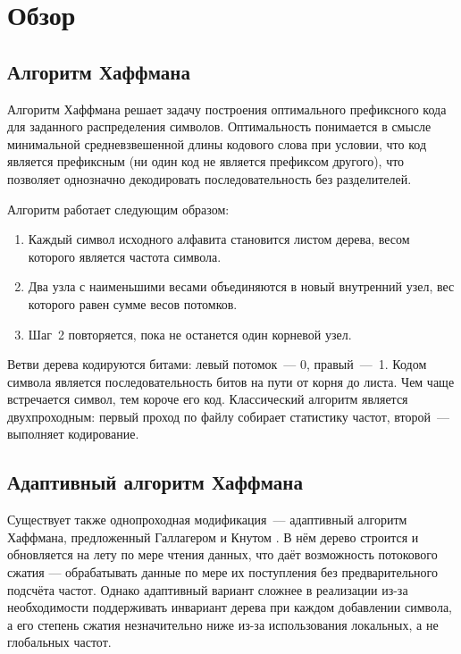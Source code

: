 \documentclass[a4paper]{article}
\begin{document}
\section{Обзор}

\subsection{Алгоритм Хаффмана}

Алгоритм Хаффмана решает
задачу построения оптимального префиксного кода для заданного распределения
символов. Оптимальность понимается в смысле минимальной средневзвешенной
длины кодового слова при условии, что код является префиксным (ни один код
не является префиксом другого), что позволяет однозначно декодировать
последовательность без разделителей.

Алгоритм работает следующим образом:
\begin{enumerate}
    \item Каждый символ исходного алфавита становится листом дерева,
          весом которого является частота символа.
    \item Два узла с наименьшими весами объединяются в новый внутренний
          узел, вес которого равен сумме весов потомков.
    \item Шаг~2 повторяется, пока не останется один корневой узел.
\end{enumerate}

Ветви дерева кодируются битами: левый потомок~--- 0, правый~---~1.
Кодом символа является последовательность битов на пути от корня до листа.
Чем чаще встречается символ, тем короче его код.
Классический алгоритм является двухпроходным: первый проход по файлу
собирает статистику частот, второй~--- выполняет кодирование.

\subsection{Адаптивный алгоритм Хаффмана}

Существует также однопроходная модификация~--- адаптивный алгоритм
Хаффмана, предложенный Галлагером \cite{gallager1978} и Кнутом \cite{knuth1985}. 
В нём дерево строится и обновляется на лету по мере чтения данных, что 
даёт возможность потокового сжатия — обрабатывать данные по мере их 
поступления без предварительного подсчёта частот.
Однако адаптивный вариант сложнее в реализации из-за необходимости
поддерживать инвариант дерева при каждом добавлении символа, а его степень
сжатия незначительно ниже из-за использования локальных, а не глобальных
частот.
\end{document}
